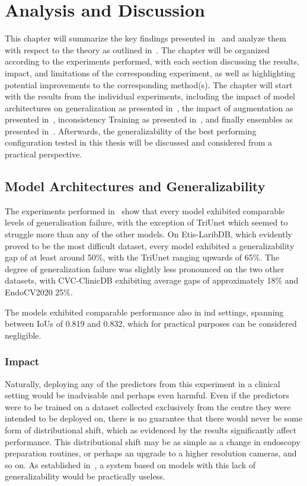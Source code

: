 \chapter{Analysis and Discussion}\label{discussion}
This chapter will summarize the key findings presented in~ and analyze them with respect to the theory as outlined in~. The chapter will be organized according to the experiments performed, with each section discussing the results, impact, and limitations of the corresponding experiment, as well as highlighting potential improvements to the corresponding method(s). The chapter will start with the results from the individual experiments, including the impact of model architectures on generalization as presented in~, the impact of augmentation as presented in~, inconsistency Training as presented in~, and finally ensembles as presented in~. Afterwards, the generalizability of the best performing configuration tested in this thesis will be discussed and considered from a practical perspective.

\section{Model Architectures and Generalizability}\label{discussion:models}
The experiments performed in~ show that every model exhibited comparable levels of generalisation failure, with the exception of TriUnet which seemed to struggle more than any of the other models. On Etis-LaribDB, which evidently proved to be the most difficult dataset, every model exhibited a generalizability gap of at least around 50\%, with the TriUnet ranging upwards of 65\%. The degree of generalization failure was slightly less pronounced on the two other datasets, with CVC-ClinicDB exhibiting average gaps of approximately 18\% and EndoCV2020 25\%. 

The models exhibited comparable performance also in \gls{ind} settings, spanning between IoUs of 0.819 and 0.832, which for practical purposes can be considered negligible. 

\subsection{Impact}
Naturally, deploying any of the predictors from this experiment in a clinical setting would be inadvisable and perhaps even harmful. Even if the predictors were to be trained on a dataset collected exclusively from the centre they were intended to be deployed on, there is no guarantee that there would never be some form of distributional shift, which as evidenced by the results significantly affect performance. This distributional shift may be as simple as a change in endoscopy preparation routines, or perhaps an upgrade to a higher resolution cameras, and so on. As established in~, a system based on models with this lack of generalizability would be practically useless. 

